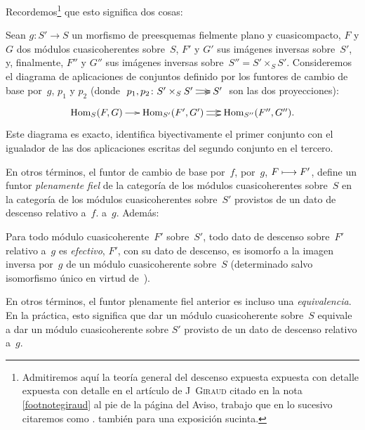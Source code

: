 Recordemos\footnote{Admitiremos aquí la teoría general del descenso
{expuesta expuesta con detalle}
{expuesta con detalle}
en el artículo de J\ptbl\ \textsc{Giraud} citado en la nota
\eqref{footnotegiraud} al pie de la página del Aviso, trabajo que en lo
sucesivo citaremos como \cite{VIII.D}. \Cf también \cite{VIII.2} para una
exposición sucinta.} que esto significa dos cosas:

\begin{corollaire}
\label{VIII.1.2}
%
Sean $g\colon S'\to S$ un morfismo de preesquemas fielmente plano y
cuasicompacto, $F$ y $G$ dos módulos cuasicoherentes sobre~$S$, $F'$ y
$G'$ sus imágenes inversas sobre~$S'$, y, finalmente, $F''$ y $G''$ sus
imágenes inversas sobre~$S''=S'\times_{S}S'$. Consideremos el diagrama de
aplicaciones de conjuntos definido por los funtores de cambio de base
por~$g$, $p_{1}$ y $p_{2}$ (donde $\xymatrix@C=.5cm{p_{1},p_{2}\colon
S'\times_{S}S'\ar@/^2pt/[r]\ar@/_2pt/[r]&S'}$ son las dos proyecciones):
$$
\xymatrix@C=.5cm{\Hom_{S}(F,G)\ar[r] &
\Hom_{S'}(F',G')\ar@/^2pt/[r]\ar@/_2pt/[r] &
\Hom_{S''}(F'',G'').}
$$
Este diagrama es exacto, \ie identifica biyectivamente el primer conjunto
con el igualador de las dos aplicaciones escritas del segundo conjunto
en el tercero.
\end{corollaire}

En otros términos, el funtor de cambio de base
{por~$f$,}
{por~$g$,}
$F\longmapsto F'$, define un funtor \emph{plenamente fiel} de la categoría de
los módulos cuasicoherentes sobre~$S$ en la categoría de los módulos
cuasicoherentes sobre~$S'$ provistos de un dato de descenso relativo
{a~$f$.}
{a~$g$.}
Además:

\begin{corollaire}
\label{VIII.1.3}
%
Para todo módulo cuasicoherente~$F'$ sobre~$S'$, todo dato de descenso
sobre~$F'$ relativo a~$g$ es \emph{efectivo},
%
\ie $F'$, con su dato de descenso, es isomorfo a la imagen inversa por~$g$
de un módulo cuasicoherente sobre~$S$ (determinado salvo isomorfismo único
en virtud de~).
\end{corollaire}

En otros términos, el funtor plenamente fiel anterior es incluso una
\emph{equivalencia}. En la práctica, esto significa que dar un módulo
cuasicoherente sobre~$S$ equivale a dar un módulo cuasicoherente sobre
$S'$ provisto de un dato de descenso relativo a~$g$.

